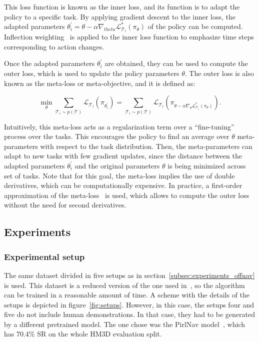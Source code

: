 This loss function is known as the inner loss, and its function is to adapt the policy to a specific task.
By applying gradient descent to the inner loss, the adapted parameters $\theta^\prime_i = \theta-\alpha\nabla_{theta}\mathcal{L}^*_{\mathcal{T}_i}(\pi_\theta)$ of the policy can be computed.
Inflection weighting~\cite{wijmans2019b} is applied to the inner loss function to emphasize time steps corresponding to action changes.

Once the adapted parameters $\theta^\prime_i$ are obtained, they can be used to compute the outer loss, which is used to update the policy parameters $\theta$.
The outer loss is also known as the meta-loss or meta-objective, and it is defined as:

\begin{equation}
    \min _{\theta} \sum_{\mathcal{T}_i \sim p(\mathcal{T})} \mathcal{L}_{\mathcal{T}_i}\left(\pi_{\theta_i^{\prime}}\right)=\sum_{\mathcal{T}_i \sim p(\mathcal{T})} \mathcal{L}_{\mathcal{T}_i}\left(\pi_{\theta-\alpha \nabla_\theta \mathcal{L}_{\mathcal{T}_i}^*\left(\pi_\theta\right)}\right).
    \label{eq:meta_loss_metanav}
\end{equation}

Intuitively, this meta-loss acts as a regularization term over a ``fine-tuning'' process over the tasks.
This encourages the policy to find an average over $\theta$ meta-parameters with respect to the task distribution.
Then, the meta-parameters can adapt to new tasks with few gradient updates, since the distance between the adapted parameters $\theta^\prime_i$ and the original parameters $\theta$ is being minimized across set of tasks.
Note that for this goal, the meta-loss implies the use of double derivatives, which can be computationally expensive.
In practice, a first-order approximation of the meta-loss~\cite{finn2017} is used, which allows to compute the outer loss without the need for second derivatives.

\subsection{Experiments}\label{subsec:experiments_metanav}

\subsubsection{Experimental setup}\label{subsubsec:experimental-setup}

The same dataset divided in five setups as in section~\ref{subsec:experiments_offnav} is used.
This dataset is a reduced version of the one used in~\cite{ramrakhya2023}, so the algorithm can be trained in a reasonable amount of time.
A scheme with the details of the setups is depicted in figure~\ref{fig:setups}.
However, in this case, the setups four and five do not include human demonstrations.
In that case, they had to be generated by a different pretrained model.
The one chose was the PirlNav model~\cite{ramrakhya2023}, which has 70.4\% SR on the whole HM3D evaluation split.

